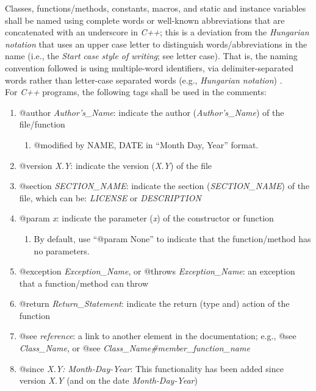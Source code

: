 \documentclass[letter,12pt]{article}
\begin{document}
Classes, functions/methods, constants, macros, and static and instance variables shall be named using complete words or well-known abbreviations that are concatenated with an underscore in {\it C++}; this is a deviation from the {\it Hungarian notation} that uses an upper case letter to distinguish words/abbreviations in the name (i.e., the {\it Start case style of writing}; see letter case). That is, the naming convention followed is using multiple-word identifiers, via delimiter-separated words rather than letter-case separated words (e.g., {\it Hungarian notation}) \cite{WikipediaContributors2017}. \\

For {\it C++} programs, the following tags shall be used in the comments: \vspace{-0.3cm}
\begin{enumerate} \itemsep -4pt
\item @author {\it Author's\_Name}: indicate the author ({\it Author's\_Name}) of the file/function \vspace{-0.3cm}
	\begin{enumerate} \itemsep -2pt
	\item @modified by NAME, DATE in ``Month Day, Year'' format.
	\end{enumerate}
\item @version {\it X.Y}: indicate the version ({\it X.Y}) of the file
\item @section {\it SECTION\_NAME}: indicate the section ({\it SECTION\_NAME}) of the file, which can be: {\it LICENSE} or {\it DESCRIPTION}
\item @param {\it x}: indicate the parameter ({\it x}) of the constructor or function \vspace{-0.3cm}
	\begin{enumerate} \itemsep -2pt
	\item By default, use ``@param None'' to indicate that the function/method has no parameters.
	\end{enumerate}
\item @exception {\it Exception\_Name}, or @throws {\it Exception\_Name}: an exception that a function/method can throw
\item @return {\it Return\_Statement}: indicate the return (type and) action of the function
\item @see {\it reference}: a link to another element in the documentation; e.g., @see {\it Class\_Name}, or @see {\it Class\_Name\#member\_function\_name}
\item @since {\it X.Y: Month-Day-Year}: This functionality has been added since version {\it X.Y} (and on the date {\it Month-Day-Year})

\end{enumerate}
\end{document}
